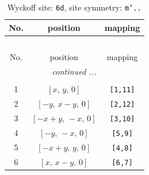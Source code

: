 \documentclass[fleqn,8pt]{jsarticle}
\begin{document}
\renewcommand{\arraystretch}{1.2}
\begin{longtable}{ccc}
\caption{Wyckoff site: {\tt 6d}, site symmetry: {\tt m'..}}
 \\
 \hline \hline
No. & position & mapping \\ \hline \endfirsthead

\multicolumn{2}{l}{\tablename\ \thetable{}} \\
 \hline \hline
No. & position & mapping \\ \hline \endhead

 \hline \hline
\multicolumn{2}{r}{\footnotesize\it continued ...} \\ \endfoot

 \hline \hline
\multicolumn{2}{r}{} \\ \endlastfoot

1 & $\left[ x,\, y,\, 0 \right]$ & {\tt [1,11]} \\ \hline
2 & $\left[ - y,\, x - y,\, 0 \right]$ & {\tt [2,12]} \\ \hline
3 & $\left[ - x + y,\, - x,\, 0 \right]$ & {\tt [3,10]} \\ \hline
4 & $\left[ - y,\, - x,\, 0 \right]$ & {\tt [5,9]} \\ \hline
5 & $\left[ - x + y,\, y,\, 0 \right]$ & {\tt [4,8]} \\ \hline
6 & $\left[ x,\, x - y,\, 0 \right]$ & {\tt [6,7]} \\
\end{longtable}
\renewcommand{\arraystretch}{1.2}
\end{document}
